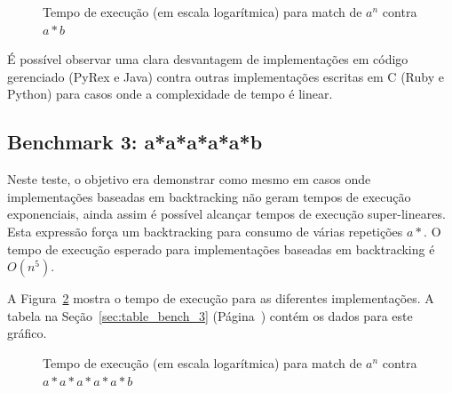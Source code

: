 \documentclass[a4paper,12pt,oneside,onecolumn]{uerj}
\begin{document}
\begin{figure}[!htbp]
\centering
{}
\caption{Tempo de execução (em escala logarítmica) para match de $a^n$ contra $a*b$}
\label{fig:graph_bench_2}
\end{figure}

É possível observar uma clara desvantagem de implementações em código gerenciado (PyRex e Java) contra outras implementações escritas em C (Ruby e Python) para casos onde a complexidade de tempo é linear.

\subsection{Benchmark 3: a*a*a*a*a*b}

Neste teste, o objetivo era demonstrar como mesmo em casos onde implementações baseadas em backtracking não geram tempos de execução exponenciais, ainda assim é possível alcançar tempos de execução super-lineares. Esta expressão força um backtracking para consumo de várias repetições $a*$. O tempo de execução esperado para implementações baseadas em backtracking é $O(n^5)$.

A Figura~\ref{fig:graph_bench_3} mostra o tempo de execução para as diferentes implementações. A tabela na Seção~\ref{sec:table_bench_3} (Página~\pageref{sec:table_bench_3}) contém os dados para este gráfico.

\begin{figure}[!htbp]
\centering
{}
\caption{Tempo de execução (em escala logarítmica) para match de $a^n$ contra $a*a*a*a*a*b$}
\label{fig:graph_bench_3}
\end{figure}
\end{document}
